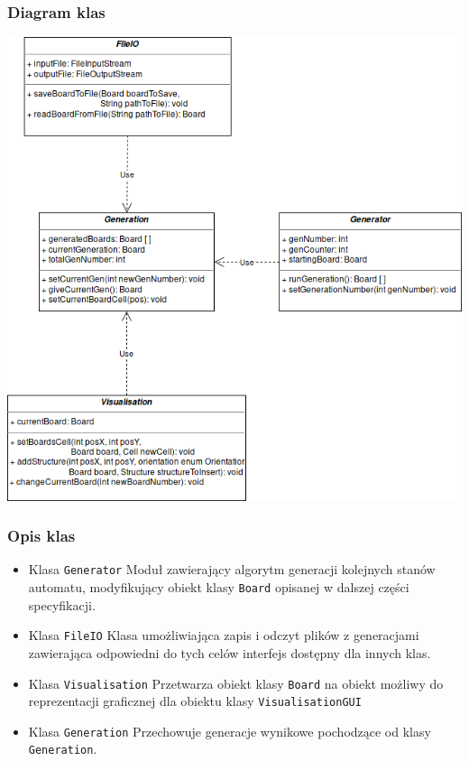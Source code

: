 \documentclass[a4paper,11pt]{article}
\begin{document}
            \subsubsection{Diagram klas}
            \begin{center}
 \includegraphics[scale=0.6]{images/pakiet_generation_controls.png}
\end{center}

            \subsubsection{Opis klas}
            \begin{itemize}
             \item Klasa \texttt{Generator} Moduł zawierający algorytm generacji kolejnych stanów automatu, modyfikujący obiekt klasy \texttt{Board} opisanej w dalszej części specyfikacji.
             \item Klasa \texttt{FileIO} Klasa umożliwiająca zapis i odczyt plików z generacjami zawierająca odpowiedni do tych celów interfejs dostępny dla innych klas.
             \item Klasa \texttt{Visualisation} Przetwarza obiekt klasy \texttt{Board} na obiekt możliwy do reprezentacji graficznej dla obiektu klasy \texttt{VisualisationGUI}
             \item Klasa \texttt{Generation} Przechowuje generacje wynikowe pochodzące od klasy \texttt{Generation}.
            \end{itemize}
\end{document}
